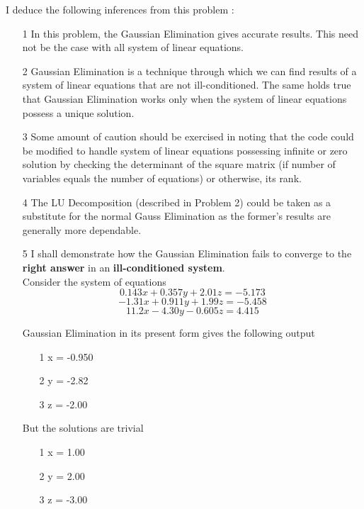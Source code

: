 \documentclass[titlepage, 11pt]{article}
\begin{document}
I deduce the following inferences from this problem :
\begin{itemize}
    \item [1] In this problem, the Gaussian Elimination gives accurate results. This need not be the case with all system of linear equations. 
    \item [2] Gaussian Elimination is a technique through which we can find results of a system of linear equations that are not ill-conditioned. The same holds true that Gaussian Elimination works only when the system of linear equations possess a unique solution.
    \item [3] Some amount of caution should be exercised in noting that the code could be modified to handle system of linear equations possessing infinite or zero solution by checking the determinant of the square matrix (if number of variables equals the number of equations) or otherwise, its rank.
    \item [4] The LU Decomposition (described in Problem 2) could be taken as a substitute for the normal Gauss Elimination as the former's results are generally more dependable. 
    \item [5] \label{Example} I shall demonstrate how the Gaussian Elimination fails to converge to the \textbf{right answer} in an \textbf{ill-conditioned system}. \\
    Consider the system of equations 
    \begin{equation}
         0.143 x + 0.357 y + 2.01 z = -5.173 
    \end{equation}
    \begin{equation}
         -1.31 x + 0.911 y + 1.99 z = -5.458 
    \end{equation}
    \begin{equation}
         11.2 x - 4.30 y - 0.605 z = 4.415  
    \end{equation}
    
    Gaussian Elimination in its present form gives the following output 
    \begin{itemize}
        \item [1] x = -0.950
        \item [2] y = -2.82
        \item [3] z = -2.00
    \end{itemize}
    
    But the solutions are trivial 
    \begin{itemize}
        \item [1] x = 1.00
        \item [2] y = 2.00
        \item [3] z = -3.00
    \end{itemize}
    

\end{itemize}
\end{document}
